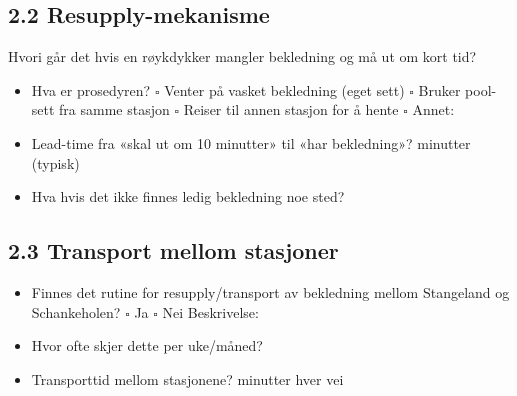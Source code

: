 \documentclass[12pt, a4paper, norsk]{article}
\begin{document}
\vspace{0.5cm}

\subsection*{2.2 Resupply-mekanisme}

\noindent
Hvori går det hvis en røykdykker mangler bekledning og må ut om kort tid?

\vspace{0.3cm}

\begin{itemize}
\item[\textbf{Q:}] Hva er prosedyren?
  \newline $\square$ Venter på vasket bekledning (eget sett)
  \newline $\square$ Bruker pool-sett fra samme stasjon
  \newline $\square$ Reiser til annen stasjon for å hente
  \newline $\square$ Annet: \underline{\hspace{8cm}}

\item[\textbf{Q:}] Lead-time fra «skal ut om 10 minutter» til «har bekledning»?\newline
  \underline{\hspace{6cm}} minutter (typisk)

\item[\textbf{Q:}] Hva hvis det ikke finnes ledig bekledning noe sted?
  \newline\underline{\hspace{12cm}}
\end{itemize}

\vspace{0.5cm}

\subsection*{2.3 Transport mellom stasjoner}

\vspace{0.3cm}

\begin{itemize}
\item[\textbf{Q:}] Finnes det rutine for resupply/transport av bekledning mellom Stangeland og Schankeholen?
  \newline $\square$ Ja $\square$ Nei
  \newline Beskrivelse: \underline{\hspace{10cm}}

\item[\textbf{Q:}] Hvor ofte skjer dette per uke/måned?
  \newline\underline{\hspace{8cm}}

\item[\textbf{Q:}] Transporttid mellom stasjonene?
  \newline\underline{\hspace{6cm}} minutter hver vei
\end{itemize}
\end{document}
